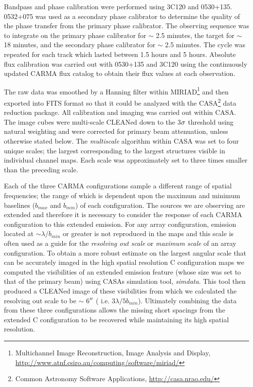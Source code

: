 \documentclass[apj]{emulateapj}
\begin{document}
Bandpass and phase calibration were performed using 3C120 and 0530+135. 0532+075 was used as a secondary phase calibrator to determine the quality of the phase transfer from the primary phase calibrator. The observing sequence was to integrate on the primary phase calibrator for $\sim$ 2.5 minutes, the target for $\sim$ 18 minutes, and the secondary phase calibrator for $\sim$ 2.5 minutes. The cycle was repeated for each track which lasted between 1.5 hours and 5 hours. Absolute flux calibration was carried out with 0530+135 and 3C120 using the continuously updated CARMA flux catalog to obtain their flux values at each observation.

The raw data was smoothed by a Hanning filter within MIRIAD\footnote{Multichannel Image Reconstruction, Image Analysis and Display, \url{http://www.atnf.csiro.au/computing/software/miriad/}} and then exported into FITS format so that it could be analyzed with the CASA\footnote{Common Astronomy Software Applications, \url{http://casa.nrao.edu/}} data reduction package. All calibration and imaging was carried out within CASA. The image cubes  were multi-scale  CLEANed down to the 3$\rm{\sigma}$ threshold using natural weighting and were corrected for primary beam attenuation, unless otherwise stated below. The \textit{multiscale} algorithm \citep{2008AJ....136.2897R} within CASA was set to four unique scales; the largest corresponding to the largest structures visible in individual channel maps. Each scale was approximately set to three times smaller than the preceding scale. 

Each of the three CARMA configurations sample a different range of spatial frequencies; the range of which is dependent upon the maximum and minimum baselines ($b_{max}$ and $b_{min}$) of each configuration. The sources we are observing are extended and therefore it is necessary to consider the response of each CARMA configuration to this extended emission. For any array configuration, emission located at $\sim \lambda/b_{min}$ or greater is not reproduced in the maps \citep{1999ASPC..180.....T} and this scale is often used as a guide for the \textit{resolving out scale} or \textit{maximum scale} of an array configuration. To obtain a more robust estimate on the largest angular scale that can be accurately imaged in the high spatial resolution C configuration maps we computed the visibilities of an extended emission feature (whose size was set to that of the primary beam) using CASAs simulation tool, \textit{simdata}. This tool then produced a CLEANed image of these visibilities from which we calculated the resolving out scale to be $\sim$ 6$\mbox{$^{\prime\prime}$}$ ( i.e. $3\lambda/5b_{min}$). Ultimately combining the data from these three configurations allows the missing short spacings from the extended C configuration to be recovered while maintaining its high spatial resolution.
\end{document}
